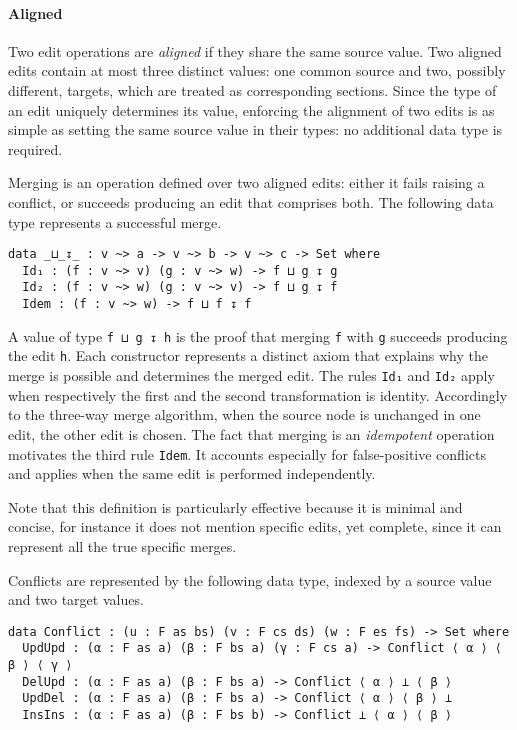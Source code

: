 \documentclass[../Thesis.tex]{subfiles}
\begin{document}
	\paragraph{Aligned}
	Two edit operations are \emph{aligned} if they share the same source value.	
	Two aligned edits contain at most three distinct values: 
	one common source and two, 	possibly different, targets, which 
	are treated as corresponding sections.
	Since the type of an edit uniquely determines its value, enforcing
	the alignment of two edits is as simple as setting the same source value 
	in their types: no additional data type is required.
	
	Merging is an operation defined over two aligned edits:
	either it fails raising a conflict, or succeeds producing an edit that 
	comprises both. 
	The following data type represents a successful merge.

\begin{verbatim}	
data _⊔_↧_ : v ~> a -> v ~> b -> v ~> c -> Set where
  Id₁ : (f : v ~> v) (g : v ~> w) -> f ⊔ g ↧ g
  Id₂ : (f : v ~> w) (g : v ~> v) -> f ⊔ g ↧ f
  Idem : (f : v ~> w) -> f ⊔ f ↧ f
\end{verbatim}

	A value of type \texttt{f ⊔ g ↧ h} is the proof that merging \texttt{f} with
	\texttt{g} succeeds producing the edit \texttt{h}.
	Each constructor represents a distinct axiom that explains why
	the merge is possible and determines the merged edit.
	The rules \texttt{Id₁} and \texttt{Id₂} apply when 
	respectively the first and the second transformation is identity.
	Accordingly to the three-way merge algorithm, when the source node
	is unchanged in one edit, the other edit is chosen.
	The fact that merging is an \emph{idempotent} operation motivates the 
	third rule \texttt{Idem}.
	It accounts especially for false-positive conflicts and applies 
	when the same edit is performed independently.
	
	Note that this definition is particularly effective because it is 
	minimal and concise, for instance it does not mention specific
	edits, yet complete, since it can represent all the true specific merges.

	Conflicts are represented by the following data type, indexed by 
	a source value and two target values.

\begin{verbatim}	
data Conflict : (u : F as bs) (v : F cs ds) (w : F es fs) -> Set where
  UpdUpd : (α : F as a) (β : F bs a) (γ : F cs a) -> Conflict ⟨ α ⟩ ⟨ β ⟩ ⟨ γ ⟩
  DelUpd : (α : F as a) (β : F bs a) -> Conflict ⟨ α ⟩ ⊥ ⟨ β ⟩
  UpdDel : (α : F as a) (β : F bs a) -> Conflict ⟨ α ⟩ ⟨ β ⟩ ⊥ 
  InsIns : (α : F as a) (β : F bs b) -> Conflict ⊥ ⟨ α ⟩ ⟨ β ⟩
\end{verbatim}
	
\end{document}
